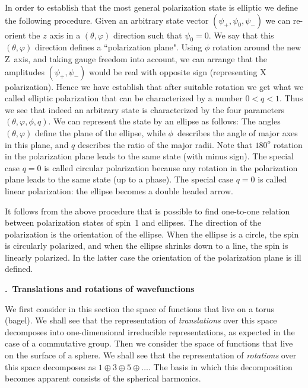 \documentclass[onecolumn,fleqn, 11pt]{revtex4}
\renewcommand{\thesubsection}{\arabic{subsection}}
\renewcommand{\thesubsubsection}{\arabic{subsubsection}}
\newcommand{\sheadC}[1]
{
\addtocounter{subsubsection}{1}
\vspace{5mm}
{\bf \thesubsection.\thesubsubsection \ #1}  
\nopagebreak
\phantomsection
}
\begin{document}
In order to establish that the most general polarization
state is elliptic we define the following procedure.  
Given an arbitrary state vector 
${(\psi_{+},\psi_0,\psi_{-})}$ we can re-orient 
the $z$ axis in a $(\theta,\varphi)$ direction 
such that $\psi_0=0$. 
We say that this $(\theta,\varphi)$ direction 
defines a ``polarization plane".
Using $\phi$ rotation around the new Z~axis, 
and taking gauge freedom into account, 
we can arrange that the amplitudes  ${(\psi_{+},\psi_{-})}$  
would be real with opposite sign (representing X polarization).
Hence we have establish that after suitable  
rotation we get what we called elliptic polarization
that can be characterized by a number ${0<q<1}$. 
Thus we see that indeed an arbitrary state 
is characterized by the four parameters ${(\theta,\varphi,\phi,q)}$. 
We can represent the state by an ellipse as follows: 
The angles $(\theta,\varphi)$ define the plane of the ellipse, 
while $\phi$~describes the angle of major axes in this plane, 
and $q$ describes the ratio of the major radii.  
Note that ${180^o}$ rotation in the polarization plane 
leads to the same state (with minus sign). 
The special case ${q=0}$ is called circular polarization 
because any rotation in the polarization plane leads to the 
same state (up to a phase). The special case ${q=0}$ 
is called linear polarization: the ellipse becomes a double headed arrow. 


It follows from the above procedure that is possible 
to find one-to-one relation between polarization states 
of spin~1 and ellipses. 
The direction of the polarization is the orientation 
of the ellipse. When the ellipse is a circle, the spin  
is circularly polarized, and when the ellipse shrinks down 
to a line, the spin is linearly polarized.  
In the latter case the orientation of the polarization plane is ill defined.


\newpage
\sheadC{Translations and rotations of wavefunctions}

We first consider in this section 
the space of functions that live on a torus (bagel).  
We shall see that the representation of {\em translations} 
over this space decomposes 
into one-dimensional irreducible representations,  
as expected in the case of a commutative group.
Then we consider the space of functions that live 
on the surface of a sphere. We shall see that 
the representation of {\em rotations} 
over this space decomposes as ${1 \oplus 3 \oplus 5 \oplus  \dots}$.
The basis in which this decomposition becomes 
apparent consists of the spherical harmonics.   
\end{document}

